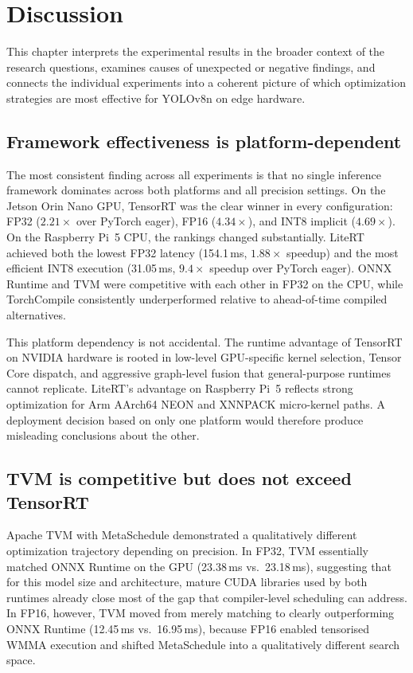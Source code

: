 \documentclass[12pt,a4paper]{report}
\begin{document}

\chapter{Discussion}

This chapter interprets the experimental results in the broader context of the research questions, examines causes of
unexpected or negative findings, and connects the individual experiments into a coherent picture of which optimization
strategies are most effective for YOLOv8n on edge hardware.

\section{Framework effectiveness is platform-dependent}

The most consistent finding across all experiments is that no single inference framework dominates across both platforms
and all precision settings.
On the Jetson Orin Nano GPU, TensorRT was the clear winner in every configuration: FP32 ($2.21\times$ over PyTorch
eager), FP16 ($4.34\times$), and INT8 implicit ($4.69\times$).
On the Raspberry Pi~5 CPU, the rankings changed substantially.
LiteRT achieved both the lowest FP32 latency (154.1\,ms, $1.88\times$ speedup) and the most efficient INT8 execution
(31.05\,ms, $9.4\times$ speedup over PyTorch eager).
ONNX Runtime and TVM were competitive with each other in FP32 on the CPU, while TorchCompile consistently underperformed
relative to ahead-of-time compiled alternatives.

This platform dependency is not accidental.
The runtime advantage of TensorRT on NVIDIA hardware is rooted in low-level GPU-specific kernel selection, Tensor Core
dispatch, and aggressive graph-level fusion that general-purpose runtimes cannot replicate.
LiteRT's advantage on Raspberry Pi~5 reflects strong optimization for Arm AArch64 NEON and XNNPACK micro-kernel paths.
A deployment decision based on only one platform would therefore produce misleading conclusions about the other.

\section{TVM is competitive but does not exceed TensorRT}

Apache TVM with MetaSchedule demonstrated a qualitatively different optimization trajectory depending on precision.
In FP32, TVM essentially matched ONNX Runtime on the GPU (23.38\,ms vs.\ 23.18\,ms), suggesting that for this model size
and architecture, mature CUDA libraries used by both runtimes already close most of the gap that compiler-level scheduling
can address.
In FP16, however, TVM moved from merely matching to clearly outperforming ONNX Runtime (12.45\,ms vs.\ 16.95\,ms),
because FP16 enabled tensorised WMMA execution and shifted MetaSchedule into a qualitatively different search space.
\end{document}
